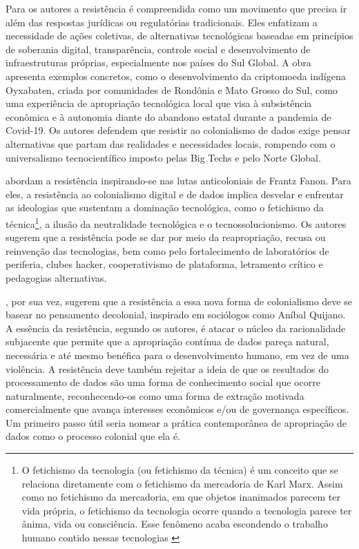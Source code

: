 Para os autores  a resistência é compreendida como um movimento que precisa ir além das respostas jurídicas ou regulatórias tradicionais. Eles enfatizam a necessidade de ações coletivas, de alternativas tecnológicas baseadas em princípios de soberania digital, transparência, controle social e desenvolvimento de infraestruturas próprias, especialmente nos países do Sul Global. A obra apresenta exemplos concretos, como o desenvolvimento da criptomoeda indígena Oyxabaten, criada por comunidades de Rondônia e Mato Grosso do Sul, como uma experiência de apropriação tecnológica local que visa à subsistência econômica e à autonomia diante do abandono estatal durante a pandemia de Covid-19. Os autores defendem que resistir ao colonialismo de dados exige pensar alternativas que partam das realidades e necessidades locais, rompendo com o universalismo tecnocientífico imposto pelas Big Techs e pelo Norte Global.

 abordam a resistência inspirando-se nas lutas anticoloniais de Frantz Fanon. Para eles, a resistência ao colonialismo digital e de dados implica desvelar e enfrentar as ideologias que sustentam a dominação tecnológica, como o fetichismo da técnica\footnote{O fetichismo da tecnologia (ou fetichismo da técnica) é um conceito que se relaciona diretamente com o fetichismo da mercadoria de Karl Marx. Assim como no fetichismo da mercadoria, em que objetos inanimados parecem ter vida própria, o fetichismo da tecnologia ocorre quando a tecnologia parece ter ânima, vida ou consciência. Esse fenômeno acaba escondendo o trabalho humano contido nessas tecnologias \cite{Faustino2023}}, a ilusão da neutralidade tecnológica e o tecnossolucionismo. Os autores sugerem que a resistência pode se dar por meio da reapropriação, recusa ou reinvenção das tecnologias, bem como pelo fortalecimento de laboratórios de periferia, clubes hacker, cooperativismo de plataforma, letramento crítico e pedagogias alternativas.

, por sua vez, sugerem que a resistência a essa nova forma de colonialismo deve se basear no pensamento decolonial, inspirado em sociólogos como Aníbal Quijano. A essência da resistência, segundo os autores, é atacar o núcleo da racionalidade subjacente que permite que a apropriação contínua de dados pareça natural, necessária e até mesmo benéfica para o desenvolvimento humano, em vez de uma violência. A resistência deve também rejeitar a ideia de que os resultados do processamento de dados são uma forma de conhecimento social que ocorre naturalmente, reconhecendo-os como uma forma de extração motivada comercialmente que avança interesses econômicos e/ou de governança específicos. Um primeiro passo útil seria nomear a prática contemporânea de apropriação de dados como o processo colonial que ela é.

